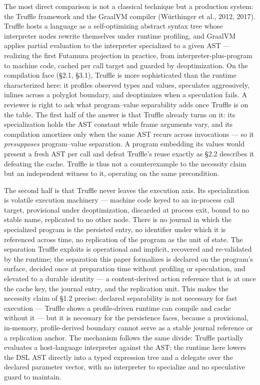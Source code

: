 \documentclass[
]{article}
\begin{document}
The most direct comparison is not a classical technique but a production
system: the Truffle framework and the GraalVM compiler (Würthinger et
al., 2012, 2017). Truffle hosts a language as a self-optimizing abstract
syntax tree whose interpreter nodes rewrite themselves under runtime
profiling, and GraalVM applies partial evaluation to the interpreter
specialized to a given AST --- realizing the first Futamura projection
in practice, from interpreter-plus-program to machine code, cached per
call target and guarded by deoptimization. On the compilation face
(§2.1, §3.1), Truffle is more sophisticated than the runtime
characterized here: it profiles observed types and values, speculates
aggressively, inlines across a polyglot boundary, and deoptimizes when a
speculation fails. A reviewer is right to ask what program--value
separability adds once Truffle is on the table. The first half of the
answer is that Truffle already turns on it: its specialization holds the
AST constant while frame arguments vary, and its compilation amortizes
only when the same AST recurs across invocations --- so it
\emph{presupposes} program--value separation. A program embedding its
values would present a fresh AST per call and defeat Truffle's reuse
exactly as §2.2 describes it defeating the cache. Truffle is thus not a
counterexample to the necessity claim but an independent witness to it,
operating on the same precondition.

The second half is that Truffle never leaves the execution axis. Its
specialization is volatile execution machinery --- machine code keyed to
an in-process call target, provisional under deoptimization, discarded
at process exit, bound to no stable name, replicated to no other node.
There is no journal in which the specialized program is the persisted
entry, no identifier under which it is referenced across time, no
replication of the program as the unit of state. The separation Truffle
exploits is operational and implicit, recovered and re-validated by the
runtime; the separation this paper formalizes is declared on the
program's surface, decided once at preparation time without profiling or
speculation, and elevated to a durable identity --- a content-derived
action reference that is at once the cache key, the journal entry, and
the replication unit. This makes the necessity claim of §1.2 precise:
declared separability is not necessary for fast execution --- Truffle
shows a profile-driven runtime can compile and cache without it --- but
it is necessary for the persistence faces, because a provisional,
in-memory, profile-derived boundary cannot serve as a stable journal
reference or a replication anchor. The mechanism follows the same
divide: Truffle partially evaluates a host-language interpreter against
the AST; the runtime here lowers the DSL AST directly into a typed
expression tree and a delegate over the declared parameter vector, with
no interpreter to specialize and no speculative guard to maintain.
\end{document}
